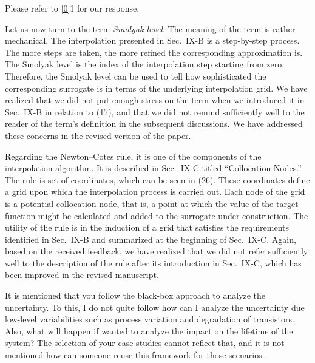 \begin{authors}
Please refer to \cref{0}{1} for our response.

Let us now turn to the term \emph{Smolyak level}. The meaning of the term is
rather mechanical. The interpolation presented in Sec.~IX-B is a step-by-step
process. The more steps are taken, the more refined the corresponding
approximation is. The Smolyak level is the index of the interpolation step
starting from zero. Therefore, the Smolyak level can be used to tell how
sophisticated the corresponding surrogate is in terms of the underlying
interpolation grid. We have realized that we did not put enough stress on the
term when we introduced it in Sec.~IX-B in relation to (17), and that we did not
remind sufficiently well to the reader of the term's definition in the
subsequent discussions. We have addressed these concerns in the revised version
of the paper.

Regarding the Newton--Cotes rule, it is one of the components of the
interpolation algorithm. It is described in Sec.~IX-C titled ``Collocation
Nodes.'' The rule is set of coordinates, which can be seen in (26). These
coordinates define a grid upon which the interpolation process is carried out.
Each node of the grid is a potential collocation node, that is, a point at which
the value of the target function might be calculated and added to the surrogate
under construction. The utility of the rule is in the induction of a grid that
satisfies the requirements identified in Sec.~IX-B and summarized at the
beginning of Sec.~IX-C. Again, based on the received feedback, we have realized
that we did not refer sufficiently well to the description of the rule after its
introduction in Sec.~IX-C, which has been improved in the revised manuscript.

\begin{actions}


\end{actions}
\end{authors}

\begin{reviewer}
It is mentioned that you follow the black-box approach to analyze the
uncertainty. To this, I do not quite follow how can I analyze the uncertainty
due low-level variabilities such as process variation and degradation of
transistors. Also, what will happen if wanted to analyze the impact on the
lifetime of the system? The selection of your case studies cannot reflect that,
and it is not mentioned how can someone reuse this framework for those
scenarios.
\end{reviewer}

